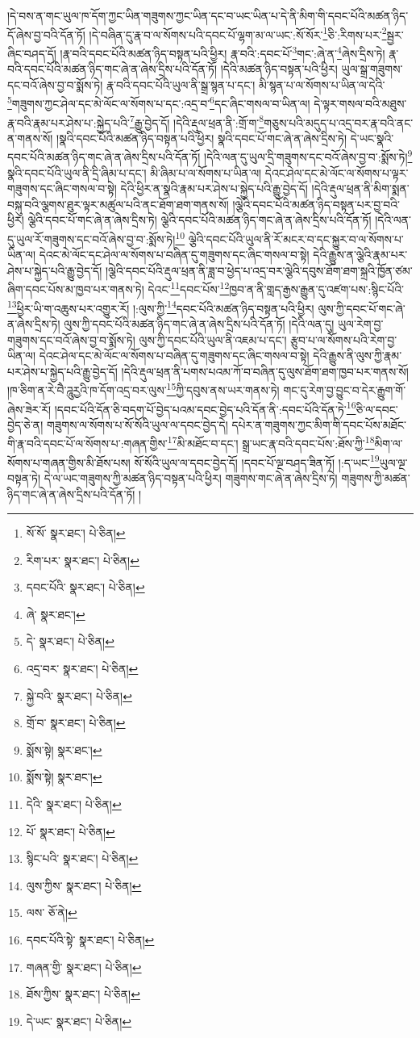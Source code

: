 །དེ་བས་ན་གང་ཡུལ་ཁ་དོག་ཀྱང་ཡིན་གཟུགས་ཀྱང་ཡིན་དང་བ་ཡང་ཡིན་པ་དེ་ནི་མིག་གི་དབང་པོའི་མཚན་ཉིད་དོ་ཞེས་བྱ་བའི་དོན་ཏོ། །དེ་བཞིན་དུ་རྣ་བ་ལ་སོགས་པའི་དབང་པོ་ལྷག་མ་ལ་ཡང་:སོ་སོར་\footnote{སོ་སོ་  སྣར་ཐང་།  པེ་ཅིན། }ཅི་:རིགས་པར་\footnote{རིག་པར་  སྣར་ཐང་།  པེ་ཅིན། }སྦྱར་ཞིང་བཤད་དོ། །རྣ་བའི་དབང་པོའི་མཚན་ཉིད་བསྟན་པའི་ཕྱིར། རྣ་བའི་:དབང་པོ་\footnote{དབང་པོའི་  སྣར་ཐང་།  པེ་ཅིན། }གང་:ཞེ་ན་\footnote{ཞེ་  སྣར་ཐང་། }ཞེས་དྲིས་ཏེ། རྣ་བའི་དབང་པོའི་མཚན་ཉིད་གང་ཞེ་ན་ཞེས་དྲིས་པའི་དོན་ཏོ། །དེའི་མཚན་ཉིད་བསྟན་པའི་ཕྱིར། ཡུལ་སྒྲ་གཟུགས་དང་བའོ་ཞེས་བྱ་བ་སྨོས་ཏེ། རྣ་བའི་དབང་པོའི་ཡུལ་ནི་སྒྲ་སྙན་པ་དང་། མི་སྙན་པ་ལ་སོགས་པ་ཡིན་ལ་དེའི་\footnote{དེ་  སྣར་ཐང་།  པེ་ཅིན། }གཟུགས་ཀྱང་ཤེལ་དང་མེ་ལོང་ལ་སོགས་པ་དང་:འདྲ་བ་\footnote{འདྲ་བར་  སྣར་ཐང་།  པེ་ཅིན། }དང་ཞིང་གསལ་བ་ཡིན་ལ། དེ་ལྟར་གསལ་བའི་མཐུས་རྣ་བའི་རྣམ་པར་ཤེས་པ་:སྐྱེད་པའི་\footnote{སྐྱེ་བའི་  སྣར་ཐང་།  པེ་ཅིན། }རྒྱུ་བྱེད་དོ། །དེའི་རྡུལ་ཕྲན་ནི་:གྲོ་ག་\footnote{གྲོ་བ་  སྣར་ཐང་།  པེ་ཅིན། }གཅུས་པའི་མདུད་པ་འདྲ་བར་རྣ་བའི་ནང་ན་གནས་སོ། །སྣའི་དབང་པོའི་མཚན་ཉིད་བསྟན་པའི་ཕྱིར། སྣའི་དབང་པོ་གང་ཞེ་ན་ཞེས་དྲིས་ཏེ། དེ་ཡང་སྣའི་དབང་པོའི་མཚན་ཉིད་གང་ཞེ་ན་ཞེས་དྲིས་པའི་དོན་ཏོ། །དེའི་ལན་དུ་ཡུལ་དྲི་གཟུགས་དང་བའོ་ཞེས་བྱ་བ་:སྨོས་ཏེ།\footnote{སྨོས་སྟེ།  སྣར་ཐང་། } སྣའི་དབང་པོའི་ཡུལ་ནི་དྲི་ཞིམ་པ་དང་། མི་ཞིམ་པ་ལ་སོགས་པ་ཡིན་ལ། དེའང་ཤེལ་དང་མེ་ལོང་ལ་སོགས་པ་ལྟར་གཟུགས་དང་ཞིང་གསལ་བ་སྟེ། དེའི་ཕྱིར་ན་སྣའི་རྣམ་པར་ཤེས་པ་སྐྱེད་པའི་རྒྱུ་བྱེད་དོ། །དེའི་རྡུལ་ཕྲན་ནི་མིག་སྨན་བསྐུ་བའི་ལྕགས་ཐུར་ལྟར་མཚུལ་པའི་ནང་ཐོག་ཐག་གནས་སོ། །ལྕེའི་དབང་པོའི་མཚན་ཉིད་བསྟན་པར་བྱ་བའི་ཕྱིར། ལྕེའི་དབང་པོ་གང་ཞེ་ན་ཞེས་དྲིས་ཏེ། ལྕེའི་དབང་པོའི་མཚན་ཉིད་གང་ཞེ་ན་ཞེས་དྲིས་པའི་དོན་ཏོ། །དེའི་ལན་དུ་ཡུལ་རོ་གཟུགས་དང་བའོ་ཞེས་བྱ་བ་:སྨོས་ཏེ།\footnote{སྨོས་སྟེ།  སྣར་ཐང་། } ལྕེའི་དབང་པོའི་ཡུལ་ནི་རོ་མངར་བ་དང་སྐྱུར་བ་ལ་སོགས་པ་ཡིན་ལ། དེའང་མེ་ལོང་དང་ཤེལ་ལ་སོགས་པ་བཞིན་དུ་གཟུགས་དང་ཞིང་གསལ་བ་སྟེ། དེའི་རྒྱུས་ན་ལྕེའི་རྣམ་པར་ཤེས་པ་སྐྱེད་པའི་རྒྱུ་བྱེད་དོ། །ལྕེའི་དབང་པོའི་རྡུལ་ཕྲན་ནི་ཟླ་བ་ཕྱེད་པ་འདྲ་བར་ལྕེའི་དབུས་ཐོག་ཐག་སྐྲའི་ཁྱོན་ཙམ་ཞིག་དབང་པོས་མ་ཁྱབ་པར་གནས་ཏེ། དེའང་\footnote{དེའི་  སྣར་ཐང་།  པེ་ཅིན། }དབང་པོས་\footnote{པོ་  སྣར་ཐང་།  པེ་ཅིན། }ཁྱབ་ན་ནི་གླད་རྒྱས་རྒྱུན་དུ་འཛག་པས་:སྙིང་པོའི་\footnote{སྙིང་པའི་  སྣར་ཐང་།  པེ་ཅིན། }ཕྱིར་ཡི་ག་འཆུས་པར་འགྱུར་རོ། །:ལུས་ཀྱི་\footnote{ལུས་ཀྱིས་  སྣར་ཐང་།  པེ་ཅིན། }དབང་པོའི་མཚན་ཉིད་བསྟན་པའི་ཕྱིར། ལུས་ཀྱི་དབང་པོ་གང་ཞེ་ན་ཞེས་དྲིས་ཏེ། ལུས་ཀྱི་དབང་པོའི་མཚན་ཉིད་གང་ཞེ་ན་ཞེས་དྲིས་པའི་དོན་ཏོ། །དེའི་ལན་དུ། ཡུལ་རེག་བྱ་གཟུགས་དང་བའོ་ཞེས་བྱ་བ་སྨོས་ཏེ། ལུས་ཀྱི་དབང་པོའི་ཡུལ་ནི་འཇམ་པ་དང་། རྩུབ་པ་ལ་སོགས་པའི་རེག་བྱ་ཡིན་ལ། དེའང་ཤེལ་དང་མེ་ལོང་ལ་སོགས་པ་བཞིན་དུ་གཟུགས་དང་ཞིང་གསལ་བ་སྟེ། དེའི་རྒྱུས་ནི་ལུས་ཀྱི་རྣམ་པར་ཤེས་པ་སྐྱེད་པའི་རྒྱུ་བྱེད་དོ། །དེའི་རྡུལ་ཕྲན་ནི་པགས་པའམ་ཀོ་བ་བཞིན་དུ་ལུས་ཐོག་ཐག་ཁྱབ་པར་གནས་སོ། །ཁ་ཅིག་ན་རེ་བཻ་ཌཱུརྱའི་ཁ་དོག་འདྲ་བར་ལུས་\footnote{ལས་  ཅོ་ནེ། }ཀྱི་དབུས་ནས་ཡར་གནས་ཏེ། གང་དུ་རེག་བྱ་བྱུང་བ་དེར་རྒྱུག་གོ་ཞེས་ཟེར་རོ། །དབང་པོའི་དོན་ཅི་བདག་པོ་བྱེད་པའམ་དབང་བྱེད་པའི་དོན་ནི་:དབང་པོའི་དོན་ཏེ་\footnote{དབང་པོའི་སྟེ་  སྣར་ཐང་།  པེ་ཅིན། }ཅི་ལ་དབང་བྱེད་ཅེ་ན། གཟུགས་ལ་སོགས་པ་སོ་སོའི་ཡུལ་ལ་དབང་བྱེད་དེ། དཔེར་ན་གཟུགས་ཀྱང་མིག་གི་དབང་པོས་མཐོང་གི་རྣ་བའི་དབང་པོ་ལ་སོགས་པ་:གཞན་གྱིས་\footnote{གཞན་གྱི་  སྣར་ཐང་།  པེ་ཅིན། }མི་མཐོང་བ་དང་། སྒྲ་ཡང་རྣ་བའི་དབང་པོས་:ཐོས་ཀྱི་\footnote{ཐོས་ཀྱིས་  སྣར་ཐང་།  པེ་ཅིན། }མིག་ལ་སོགས་པ་གཞན་གྱིས་མི་ཐོས་པས། སོ་སོའི་ཡུལ་ལ་དབང་བྱེད་དོ། །དབང་པོ་ལྔ་བཤད་ཟིན་ཏོ། །:ད་ཡང་\footnote{དེ་ཡང་  སྣར་ཐང་།  པེ་ཅིན། }ཡུལ་ལྔ་བསྟན་ཏེ། དེ་ལ་ཡང་གཟུགས་ཀྱི་མཚན་ཉིད་བསྟན་པའི་ཕྱིར། གཟུགས་གང་ཞེ་ན་ཞེས་དྲིས་ཏེ། གཟུགས་ཀྱི་མཚན་ཉིད་གང་ཞེ་ན་ཞེས་དྲིས་པའི་དོན་ཏོ། །
